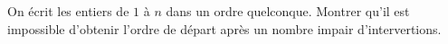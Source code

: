 On écrit les entiers de $1$ à $n$ dans un ordre quelconque. Montrer qu'il est impossible d'obtenir l'ordre de départ après un nombre impair d'intervertions.
